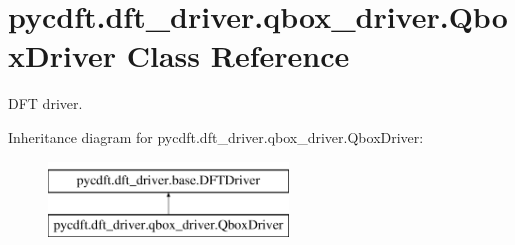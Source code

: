 \hypertarget{classpycdft_1_1dft__driver_1_1qbox__driver_1_1QboxDriver}{\section{pycdft.\-dft\-\_\-driver.\-qbox\-\_\-driver.\-Qbox\-Driver Class Reference}
\label{classpycdft_1_1dft__driver_1_1qbox__driver_1_1QboxDriver}
}


D\-F\-T driver.  


Inheritance diagram for pycdft.\-dft\-\_\-driver.\-qbox\-\_\-driver.\-Qbox\-Driver\-:\begin{figure}[H]
\begin{center}
\leavevmode
\includegraphics[height=2.000000cm]{classpycdft_1_1dft__driver_1_1qbox__driver_1_1QboxDriver}
\end{center}
\end{figure}
